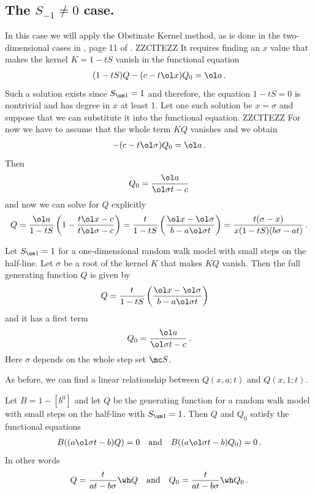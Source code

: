 \subsection{The $S_{-1} \neq 0$ case.}
In this case we will apply the Obstinate Kernel method, as is done in the two-dimensional cases in \cite{tabbara2014exact}, page 11 of \cite[p=11]{wong2014confining}. ZZCITEZZ It requires finding an $x$ value that makes the kernel $K = 1 - tS$ vanish in the functional equation
\begin{align}
	(1-tS)Q - (c -t\ol x)Q_0 = \ol a\,.
\end{align}
Such a solution exists since $S_{\um 1} = 1$ and therefore, the equation $1 - tS = 0$ is nontrivial and has degree in $x$ at least 1. Let one such solution be $x = \sigma$ and suppose that we can substitute it into the functional equation. ZZCITEZZ For now we have to assume that the whole term $KQ$ vanishes and we obtain
\begin{align}
	- (c - t\ol \sigma)Q_0 = \ol a\,.
\end{align}
Then
\begin{align}
	Q_0 = \frac{\ol a}{\ol \sigma t-c}
\end{align}
and now we can solve for $Q$ explicitly
\begin{align}
	Q = \frac{\ol a}{1-tS}\left(1 - \frac{t\ol x -c}{t\ol \sigma-c}\right) = \frac{t}{1-tS}\left(\frac{\ol x -\ol \sigma}{b-a\ol \sigma t}\right) = \frac{t(\sigma-x)}{x(1-tS)(b\sigma-at)}\,.
\end{align}
\begin{prop} Let $S_{\um 1} = 1$ for a one-dimensional random walk model with small steps on the half-line. Let $\sigma$ be a root of the kernel $K$ that makes $KQ$ vanish. Then the full generating function $Q$ is given by
\begin{align}
	Q &= \frac{t}{1-tS}\left(\frac{\ol x -\ol \sigma}{b-a\ol \sigma t}\right)
\end{align}
and it has a first term
\begin{align}
	Q_0 = \frac{\ol a}{\ol \sigma t-c}\,.
\end{align}
Here $\sigma$ depends on the whole step set $\mc S$.
\end{prop}
As before, we can find a linear relationship between $Q(x,a;t)$ and $Q(x,1;t)$.
\begin{prop} Let $B = 1 - [b^0]$ and let $Q$ be the generating function for a random walk model with small steps on the half-line with $S_{\um 1} = 1$. Then $Q$ and $Q_0$ satisfy the functional equations
\begin{align}
	B((a\ol \sigma t-b)Q) = 0\quad\text{and}\quad B((a\ol \sigma t-b)Q_0) = 0\,.
\end{align}
In other words
\begin{align}
	Q = \frac{t}{at-b\sigma}\wh Q \quad\text{and}\quad Q_0 = \frac{t}{at-b\sigma}\wh Q_0\,.
\end{align}
\end{prop}

